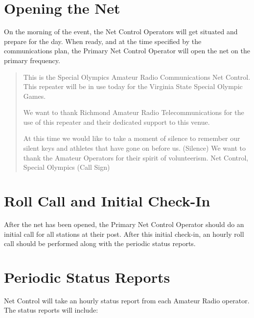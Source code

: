\documentclass[pdflatex,letterpaper,twoside,12pt]{book}
\begin{document}

\section{Opening the Net}

On the morning of the event, the Net Control Operators will get situated and prepare for the day. When ready, and at the time specified by the communications plan, the Primary Net Control Operator will open the net on the primary frequency. 

\begin{quote}
	This is the Special Olympics Amateur Radio Communications Net Control.  This repeater will be in use today for the Virginia State Special Olympic Games.

	We want to thank Richmond Amateur Radio Telecommunications for the use of this repeater and their dedicated support to this venue.

	At this time we would like to take a moment of silence to remember our silent keys and athletes that have gone on before us.  (Silence) We want to thank the Amateur Operators for their spirit of volunteerism.  Net Control, Special Olympics (Call Sign)
\end{quote}


\section{Roll Call and Initial Check-In}

After the net has been opened, the Primary Net Control Operator should do an initial call for all stations at their post. After this initial check-in, an hourly roll call should be performed along with the periodic status reports. 


\section{Periodic Status Reports}

Net Control will take an hourly status report from each Amateur Radio operator. The status reports will include:
\end{document}
